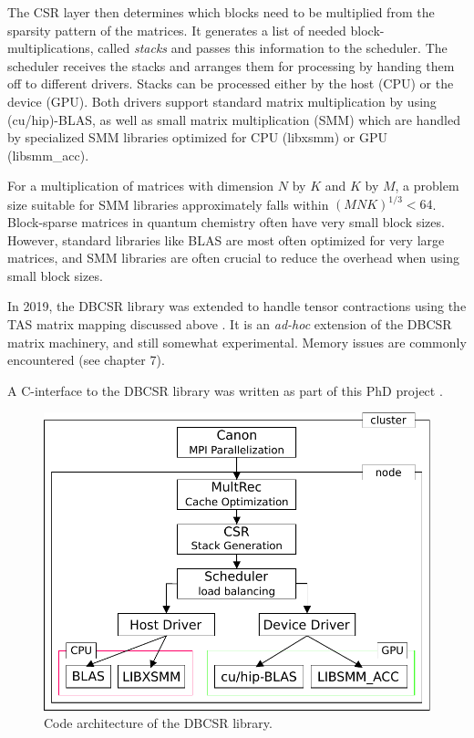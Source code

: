 The CSR layer then determines which blocks need to be multiplied from the sparsity pattern of the matrices. It generates a list of needed block-multiplications, called \emph{stacks} and passes this information to the scheduler. The scheduler receives the stacks and arranges them for processing by handing them off to different drivers. Stacks can be processed either by the host (CPU) or the device (GPU). Both drivers support standard matrix multiplication by using (cu/hip)-BLAS, as well as small matrix multiplication (SMM) which are handled by specialized SMM libraries optimized for CPU (libxsmm) or GPU (libsmm\_acc). 

For a multiplication of matrices with dimension $N$ by $K$ and $K$ by $M$, a problem size suitable for SMM libraries approximately falls within $(MNK)^{1/3} < 64$. Block-sparse matrices in quantum chemistry often have very small block sizes. However, standard libraries like BLAS are most often optimized for very large matrices, and SMM libraries are often crucial to reduce the overhead when using small block sizes. 

In 2019, the DBCSR library  was extended to handle tensor contractions using the TAS matrix mapping discussed above \cite{Siv2019}. It is an \emph{ad-hoc} extension of the DBCSR matrix machinery, and still somewhat experimental. Memory issues are commonly encountered (see chapter 7).

A C-interface to the DBCSR library was written as part of this PhD project \cite{Amb2020}.


\begin{figure}
\centering
\includegraphics[scale=0.9]{Pics/DBCSRARCH}
\caption{Code architecture of the DBCSR library.}
\label{fig:ARCH}
\end{figure}




